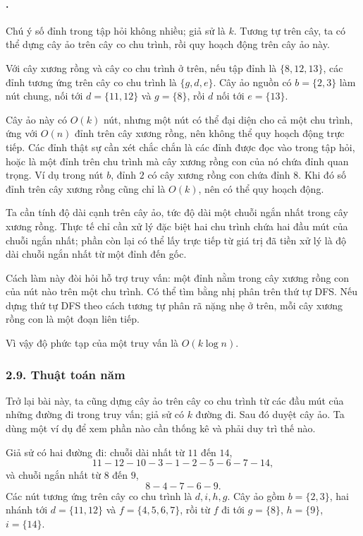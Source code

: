 \documentclass[11pt]{article}
\begin{document}
\paragraph{.}
Chú ý số đỉnh trong tập hỏi không nhiều; giả sử là \(k\). Tương tự trên cây,
ta có thể dựng cây ảo trên cây co chu trình, rồi quy hoạch động trên cây ảo
này.

Với cây xương rồng và cây co chu trình ở trên, nếu tập đỉnh là
\(\{8,12,13\}\), các đỉnh tương ứng trên cây co chu trình là \(\{g,d,e\}\).
Cây ảo nguồn có \(b=\{2,3\}\) làm nút chung, nối tới \(d=\{11,12\}\) và
\(g=\{8\}\), rồi \(d\) nối tới \(e=\{13\}\).

Cây ảo này có \(O(k)\) nút, nhưng một nút có thể đại diện cho cả một chu
trình, ứng với \(O(n)\) đỉnh trên cây xương rồng, nên không thể quy hoạch động
trực tiếp. Các đỉnh thật sự cần xét chắc chắn là các đỉnh được đọc vào trong
tập hỏi, hoặc là một đỉnh trên chu trình mà cây xương rồng con của nó chứa
đỉnh quan trọng. Ví dụ trong nút \(b\), đỉnh \(2\) có cây xương rồng con chứa
đỉnh \(8\). Khi đó số đỉnh trên cây xương rồng cũng chỉ là \(O(k)\), nên có
thể quy hoạch động.

Ta cần tính độ dài cạnh trên cây ảo, tức độ dài một chuỗi ngắn nhất trong cây
xương rồng. Thực tế chỉ cần xử lý đặc biệt hai chu trình chứa hai đầu mút của
chuỗi ngắn nhất; phần còn lại có thể lấy trực tiếp từ giá trị đã tiền xử lý
là độ dài chuỗi ngắn nhất từ một đỉnh đến gốc.

Cách làm này đòi hỏi hỗ trợ truy vấn: một đỉnh nằm trong cây xương rồng con
của nút nào trên một chu trình. Có thể tìm bằng nhị phân trên thứ tự DFS. Nếu
dựng thứ tự DFS theo cách tương tự phân rã nặng nhẹ ở trên, mỗi cây xương
rồng con là một đoạn liên tiếp.

Vì vậy độ phức tạp của một truy vấn là \(O(k\log n)\).

\subsubsection*{2.9. Thuật toán năm}

Trở lại bài này, ta cũng dựng cây ảo trên cây co chu trình từ các đầu mút của
những đường đi trong truy vấn; giả sử có \(k\) đường đi. Sau đó duyệt cây ảo.
Ta dùng một ví dụ để xem phần nào cần thống kê và phải duy trì thế nào.

Giả sử có hai đường đi: chuỗi dài nhất từ \(11\) đến \(14\),
\[
  11-12-10-3-1-2-5-6-7-14,
\]
và chuỗi ngắn nhất từ \(8\) đến \(9\),
\[
  8-4-7-6-9.
\]
Các nút tương ứng trên cây co chu trình là \(d,i,h,g\). Cây ảo gồm
\(b=\{2,3\}\), hai nhánh tới \(d=\{11,12\}\) và \(f=\{4,5,6,7\}\), rồi từ
\(f\) đi tới \(g=\{8\}\), \(h=\{9\}\), \(i=\{14\}\).
\end{document}
